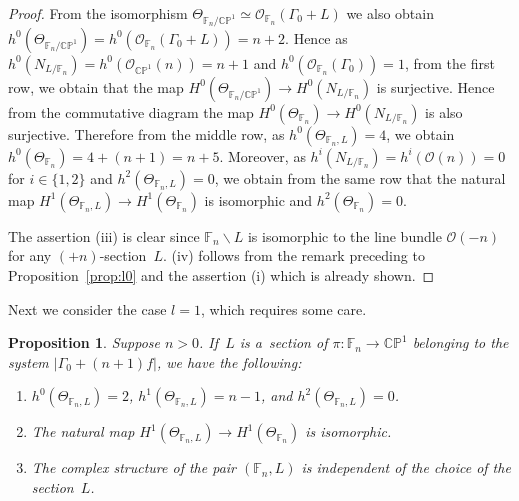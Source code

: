 \documentclass[pdftex]{sigma}
\numberwithin{equation}{section}
\newtheorem{Proposition}[Theorem]{Proposition}
{\theoremstyle{definition}
\newtheorem{Definition}[Theorem]{Definition}
\newtheorem{Remark}[Theorem]{Remark}
}
\begin{document}
\begin{proof}
From the isomorphism $\Theta_{\mathbb{F}_n/\mathbb{CP}^1}\simeq \mathscr O_{\mathbb{F}_n}(\Gamma_0+ L )$ we also obtain
$h^0(\Theta_{\mathbb{F}_n/\mathbb{CP}^1}) = h^0(\mathscr O_{\mathbb{F}_n}(\Gamma_0+ L )) = n + 2$.
Hence as $h^0(N_{ L /\mathbb{F}_n}) =h^0(\mathscr O_{\mathbb{CP}^1}(n)) = n+1$ and $h^0(\mathscr
O_{\mathbb{F}_n}(\Gamma_0)) = 1$, from the f\/irst row, we obtain that the map $H^0( \Theta_{\mathbb{F}_n/\mathbb{CP}^1}
) \to H^0(N_{ L /\mathbb{F}_n})$ is surjective.
Hence from the commutative diagram the map $H^0( \Theta_{\mathbb{F}_n} ) \to H^0(N_{ L /\mathbb{F}_n})$ is also
surjective.
Therefore from the middle row, as $h^0(\Theta_{\mathbb{F}_n,L}) = 4 $, we obtain $h^0(\Theta_{\mathbb{F}_n}) = 4 + (n+1)
= n+5$.
Moreover, as $h^i(N_{L/\mathbb{F}_n}) = h^i(\mathscr O(n))=0$ for $i\in\{1,2\}$ and $h^2(\Theta_{\mathbb{F}_n,L}) = 0$,
we obtain from the same row that the natural map $H^1(\Theta_{\mathbb{F}_n,L})\to H^1(\Theta_{\mathbb{F}_n})$ is
isomorphic and $h^2(\Theta_{\mathbb{F}_n})=0$.

The assertion (iii)
is clear since $\mathbb{F}_n\backslash L$ is isomorphic to the line bundle $\mathscr O(-n)$ for any
$(+n)$-section~$L$.
(iv) follows from the remark preceding to Proposition~\ref{prop:l0} and the assertion (i) which is already shown.
\end{proof}

Next we consider the case $l=1$, which requires some care.

\begin{Proposition}\label{prop:l1}
Suppose $n>0$.
If~$L$ is a~section of $\pi:\mathbb{F}_n\to\mathbb{CP}^1$ belonging to the system $|\Gamma_0 + (n+1)f|$, we have the following:
\begin{enumerate}\itemsep=0pt
\item[$(i)$] $ h^0(\Theta_{\mathbb{F}_n,L})=2$, $h^1(\Theta_{\mathbb{F}_n,L})= n-1$, and $h^2(\Theta_{\mathbb{F}_n,L})= 0$.
\item[$(ii)$] The natural map $H^1(\Theta_{\mathbb{F}_n,L})\to H^1(\Theta_{\mathbb{F}_n})$ is isomorphic.
\item[$(iii)$] The complex structure of the pair $(\mathbb{F}_n,L)$ is independent of the choice of the section~$L$.
\end{enumerate}
\end{Proposition}
\end{document}

